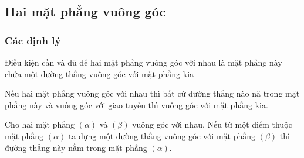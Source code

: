 \subsection{Hai mặt phẳng vuông góc}
\subsubsection{Các định lý}
\begin{dl}
	Điều kiện cần và đủ để hai mặt phẳng vuông góc với nhau là mặt phẳng này chứa một đường thẳng vuông góc với mặt phẳng kia
\end{dl}

\begin{hq}
	Nếu hai mặt phẳng vuông góc với nhau thì bất cứ đường thẳng nào nă trong mặt phẳng này và vuông góc với giao tuyến thì vuông góc với mặt phẳng kia.
\end{hq}

\begin{hq}\label{hq2}
	Cho hai mặt phẳng $(\alpha)$ và $(\beta)$ vuông góc với nhau. Nếu từ một điểm thuộc mặt phẳng $(\alpha)$ ta dựng một đường thẳng vuông góc với mặt phẳng $(\beta)$ thì đường thẳng này nằm trong mặt phẳng $(\alpha)$.
\end{hq}

